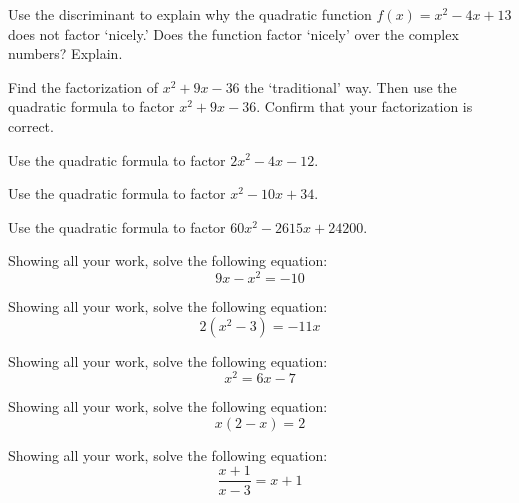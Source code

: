 \documentclass[11pt,letterpaper]{article}
\begin{document}

 Use the discriminant to explain why the quadratic function $f(x)= x^2 - 4x + 13$ does not factor `nicely.' Does the function factor `nicely' over the complex numbers? Explain. 



\newpage



 Find the factorization of $x^2 + 9x - 36$ the `traditional' way. Then use the quadratic formula to factor $x^2 + 9x - 36$. Confirm that your factorization is correct. 



\newpage



 Use the quadratic formula to factor $2x^2 - 4x - 12$. 



\newpage



 Use the quadratic formula to factor $x^2 - 10x + 34$. 



\newpage



 Use the quadratic formula to factor $60x^2 - 2615x + 24200$. 



\newpage



 Showing all your work, solve the following equation:
	\[
	9x - x^2= -10
	\]



\newpage



 Showing all your work, solve the following equation:
	\[
	2(x^2 - 3)= -11x
	\]



\newpage



 Showing all your work, solve the following equation:
	\[
	x^2= 6x - 7
	\]



\newpage



 Showing all your work, solve the following equation:
	\[
	x(2 - x)= 2
	\]



\newpage


 Showing all your work, solve the following equation:
	\[
	\dfrac{x + 1}{x - 3}= x + 1
	\]
\end{document}
